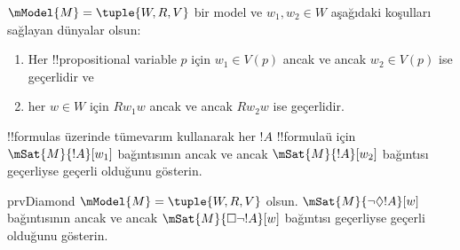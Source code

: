 \begin{prob}
  $\mModel{M} = \tuple{W, R, V}$ bir model ve $w_1, w_2 \in W$ aşağıdaki
  koşulları sağlayan dünyalar olsun:
  \begin{enumerate}
  \item Her !!{propositional variable} $p$ için $w_1 \in V(p)$ ancak ve
    ancak $w_2 \in V(p)$ ise geçerlidir ve
  \item her $w \in W$ için $Rw_1w$ ancak ve ancak $Rw_2w$ ise geçerlidir.
  \end{enumerate}
  !!{formula}s üzerinde tümevarım kullanarak her $!A$ !!{formula}{}ü için
  $\mSat{M}{!A}[w_1]$ bağıntısının ancak ve ancak $\mSat{M}{!A}[w_2]$
  bağıntısı geçerliyse geçerli olduğunu gösterin.
\end{prob}

\begin{probtag}{prvDiamond}
  $\mModel{M} = \tuple{W, R, V}$ olsun. $\mSat{M}{\lnot\Diamond !A}[w]$
  bağıntısının ancak ve ancak $\mSat{M}{\Box\lnot!A}[w]$ bağıntısı geçerliyse
  geçerli olduğunu gösterin.
\end{probtag}

